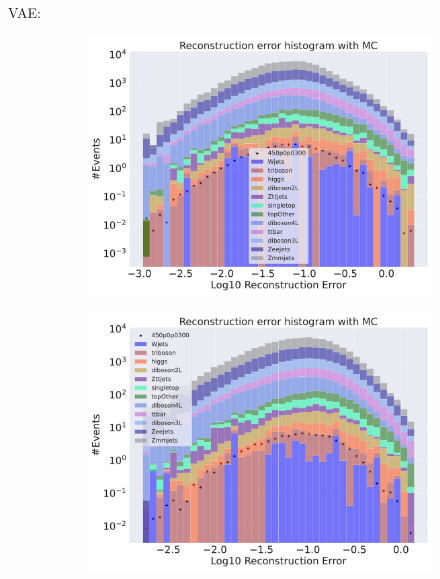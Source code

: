 VAE:




\begin{figure}[H]
    \centering
    \begin{subfigure}{.45\textwidth}
        \includegraphics[width=\textwidth]{Figures/VAE_testing/big/3lep/b_data_recon_big_rm3_feats_sig_450p0p0300.pdf}
        \caption{ }
        \label{fig:VAE_3lep_big_450}
    \end{subfigure}
    \hfill
    \begin{subfigure}{.45\textwidth}
        \includegraphics[width=\textwidth]{Figures/VAE_testing/small/3lep/b_data_recon_big_rm3_feats_sig_450p0p0300.pdf}
        \caption{}
        \label{fig:VAE_3lep_small_450}

\end{subfigure}
\end{figure}
